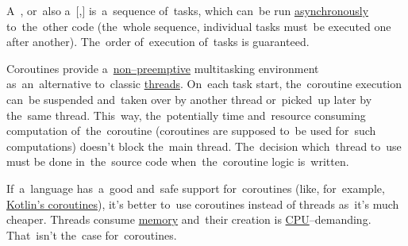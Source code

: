\label{coroutines}
A~, or~also a~[,] is~a~sequence of~tasks, which can~be run \hyperref[concurrentparallelasynchronous]{asynchronously} to~the~other code (the~whole sequence, individual tasks must~be executed one after another).
The~order of~execution of~tasks is guaranteed.

Coroutines provide a~\hyperref[preemption]{non--preemptive} multitasking environment as~an~alternative to~classic \hyperref[multithreading]{threads}.
On~each task start, the~coroutine execution can~be suspended and~taken over by another thread or~picked~up later by the~same thread.
This~way, the~potentially time and~resource consuming computation of~the~coroutine (coroutines are supposed to~be used for~such computations) doesn't block the~main thread.
The~decision which~thread to~use must be done in~the~source code when~the~coroutine logic \mbox{is written.}

If~a~language has~a~good and~safe support for~coroutines (like, for~example, \hyperref[kotlincoroutine]{Kotlin's coroutines}), it's better to~use coroutines instead of threads as~it's much cheaper.
Threads consume \hyperref[systemmemory]{memory} and~their creation is \hyperref[processorcpucore]{CPU}--demanding.
That~isn't the~case for~coroutines.
